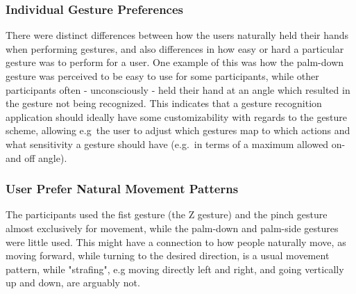 \subsubsection{Individual Gesture Preferences}
There were distinct differences between how the users naturally held their hands when performing gestures, and also differences in how easy or hard a particular gesture 
was to perform for a user. One example of this was how the palm-down gesture was perceived to be easy to use for some participants, while other participants 
often - unconsciously - held their hand at an angle which resulted in the gesture not being recognized.
This indicates that a gesture recognition application should ideally have some customizability with regards to the gesture scheme, allowing e.g~the user to adjust
which gestures map to which actions and what sensitivity a gesture should have (e.g.~in terms of a maximum allowed on- and off angle).

\subsubsection{User Prefer Natural Movement Patterns}
The participants used the fist gesture (the Z gesture) and the pinch gesture almost exclusively for movement, while the palm-down and palm-side gestures were little used. 
This might have a connection to how people naturally move, as moving forward, while turning to the desired direction, is a usual movement pattern, while "strafing", e.g 
moving directly left and right, and going vertically up and down, are arguably not. \\\\





% 

